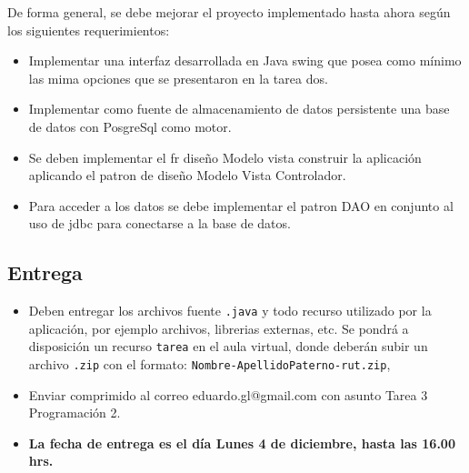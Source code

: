 \documentclass[a4paper,10pt]{article}
\theoremstyle{mytheor}
\begin{document}
De forma general, se debe mejorar el proyecto implementado hasta ahora según los siguientes requerimientos:
\begin{itemize}
    \item Implementar una interfaz desarrollada en Java swing que posea  como mínimo las mima opciones que se presentaron en la tarea dos.
    \item Implementar como fuente de almacenamiento de datos persistente una base de datos con PosgreSql como motor.
    \item Se deben implementar el fr diseño Modelo vista construir la aplicación aplicando el patron de diseño Modelo Vista Controlador.
    \item Para acceder a los datos se debe implementar el patron DAO en conjunto al uso de jdbc para conectarse a la base de datos.
\end{itemize}

\subsection{Entrega}
\begin{itemize}
  \item Deben entregar los archivos fuente \texttt{.java} y todo recurso utilizado por la aplicaci\'on, por ejemplo archivos, librerias externas, etc. Se pondr\'a a disposici\'on un recurso
  \texttt{tarea} en el aula virtual, donde deber\'an subir un archivo \texttt{.zip} con el formato: \texttt{Nombre-ApellidoPaterno-rut.zip},
  \item Enviar comprimido al correo eduardo.gl@gmail.com con asunto  Tarea 3 Programaci\'on 2.
  \item \textbf{La fecha de entrega es el d\'ia Lunes 4 de diciembre, hasta las 16.00 hrs.}
\end{itemize}
\end{document}

